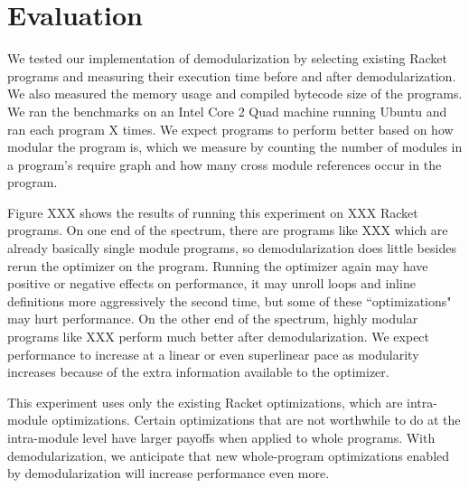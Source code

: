 \chapter{Evaluation}

We tested our implementation of demodularization by selecting existing Racket programs and measuring their execution time before and after demodularization.
We also measured the memory usage and compiled bytecode size of the programs.
We ran the benchmarks on an Intel Core 2 Quad machine running Ubuntu and ran each program X times.
We expect programs to perform better based on how modular the program is, which we measure by counting the number of modules in a program's require graph and how many cross module references occur in the program.

Figure XXX shows the results of running this experiment on XXX Racket programs. 
On one end of the spectrum, there are programs like XXX which are already basically single module programs, so demodularization does little besides rerun the optimizer on the program. Running the optimizer again may have positive or negative effects on performance, it may unroll loops and inline definitions more aggressively the second time, but some of these ``optimizations" may hurt performance.
On the other end of the spectrum, highly modular programs like XXX perform much better after demodularization.
We expect performance to increase at a linear or even superlinear pace as modularity increases because of the extra information available to the optimizer.

This experiment uses only the existing Racket optimizations, which are intra-module optimizations.
Certain optimizations that are not worthwhile to do at the intra-module level have larger payoffs when applied to whole programs. 
With demodularization, we anticipate that new whole-program optimizations enabled by demodularization will increase performance even more.

